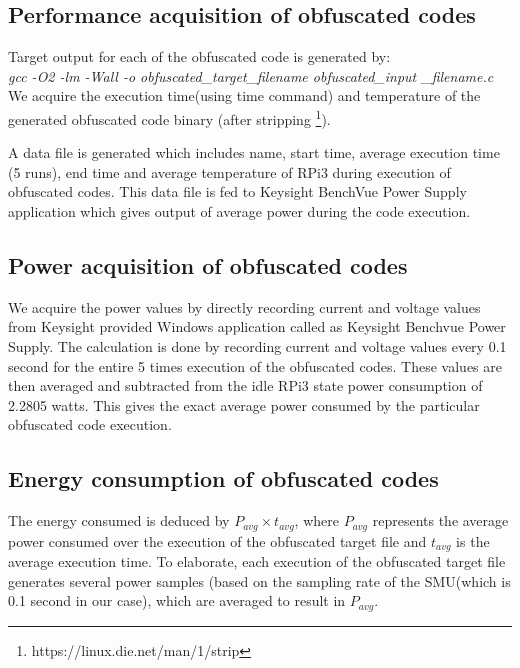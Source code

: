 \subsection{Performance acquisition of obfuscated codes}\label{subsec:pdoc}
Target output for each of the obfuscated code is generated by:\\
\textit{gcc -O2 -lm -Wall -o obfuscated\_target\_filename obfuscated\_input \_filename.c}\\

We acquire the execution time(using time command) and temperature of the generated obfuscated code binary (after stripping \footnote{https://linux.die.net/man/1/strip}).

A data file is generated which includes name, start time, average execution time (5 runs), end time and average temperature of RPi3 during execution of obfuscated codes. This data file is fed to Keysight BenchVue Power Supply application which gives output of average power during the code execution. 


\subsection{{Power acquisition of obfuscated codes}}
We acquire the power values by directly recording current and voltage values from Keysight provided Windows application called as Keysight Benchvue Power Supply. The calculation is done by recording current and voltage values every 0.1 second for the entire 5 times execution of the obfuscated codes.
These values are then averaged and subtracted from the idle RPi3 state power consumption of 2.2805 watts. This gives the exact average power consumed by the particular obfuscated code execution.


\subsection{Energy consumption of obfuscated codes}
The energy consumed is deduced by $P_{avg} \times t_{avg}$, where $P_{avg}$ represents the average power consumed over the execution of the obfuscated target file and $t_{avg}$ is the average execution time. To elaborate, each execution of the obfuscated target file generates several power samples (based on the sampling rate of the SMU(which is 0.1 second in our case), which are averaged to result in $P_{avg}$. 
